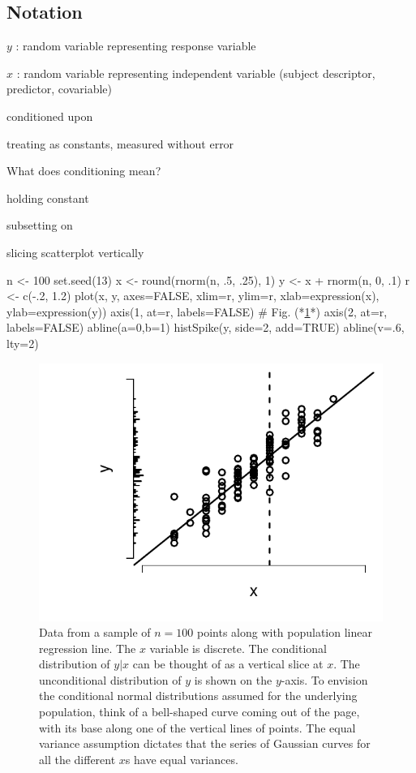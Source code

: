 \subsection{Notation}
\bi
\item $y$ : random variable representing response variable
\item $x$ : random variable representing independent variable (subject
  descriptor, predictor, covariable)
  \bi
  \item conditioned upon
  \item treating as constants, measured without error
  \ei
\item What does conditioning mean?
  \bi
  \item holding constant
  \item subsetting on
  \item slicing scatterplot vertically
  \ei
\begin{Schunk}
\begin{Sinput}
n <- 100
set.seed(13)
x <- round(rnorm(n, .5, .25), 1)
y <- x + rnorm(n, 0, .1)
r <- c(-.2, 1.2)
plot(x, y, axes=FALSE, xlim=r, ylim=r, xlab=expression(x), ylab=expression(y))
axis(1, at=r, labels=FALSE)     # Fig. (*\ref{fig:reg-simple-linear-reg}*)
axis(2, at=r, labels=FALSE)
abline(a=0,b=1)
histSpike(y, side=2, add=TRUE)
abline(v=.6, lty=2)
\end{Sinput}
\begin{figure}[htbp]

\centerline{\includegraphics[width=\maxwidth]{reg-simple-linear-reg-1} }

\caption[Sample of $n=100$ points with a linear regression line]{Data from a sample of $n=100$ points along with population linear regression line.  The $x$ variable is discrete.  The conditional distribution of $y | x$ can be thought of as a vertical slice at $x$.  The unconditional distribution of $y$ is shown on the $y$-axis.  To envision the conditional normal distributions assumed for the underlying population, think of a bell-shaped curve coming out of the page, with its base along one of the vertical lines of points.  The equal variance assumption dictates that the series of Gaussian curves for all the different $x$s have equal variances.}\label{fig:reg-simple-linear-reg}
\end{figure}
\end{Schunk}
